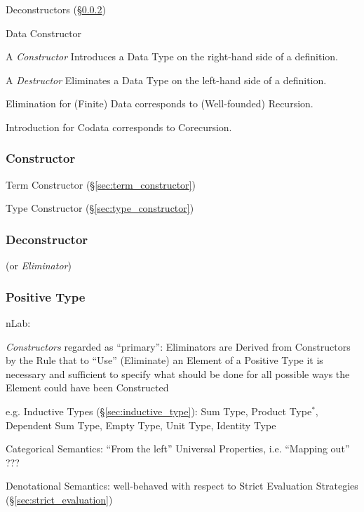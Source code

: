 Deconstructors (\S\ref{sec:deconstructor})


\asterism


Data Constructor

A \emph{Constructor} Introduces a Data Type on the right-hand side of
a definition.

A \emph{Destructor} Eliminates a Data Type on the left-hand side of a
definition.

Elimination for (Finite) Data corresponds to (Well-founded)
Recursion.

Introduction for Codata corresponds to Corecursion.




\subsubsection{Constructor}\label{sec:constructor}

Term Constructor (\S\ref{sec:term_constructor})

Type Constructor (\S\ref{sec:type_constructor})



\subsubsection{Deconstructor}\label{sec:deconstructor}

(or \emph{Eliminator})



\subsubsection{Positive Type}\label{sec:positive_type}

nLab:

\emph{Constructors} regarded as ``primary'': Eliminators are Derived
from Constructors by the Rule that to ``Use'' (Eliminate) an Element
of a Positive Type it is necessary and sufficient to specify what
should be done for all possible ways the Element could have been
Constructed

e.g. Inductive Types (\S\ref{sec:inductive_type}): Sum Type, Product
Type$^*$, Dependent Sum Type, Empty Type, Unit Type, Identity Type

Categorical Semantics: ``From the left'' Universal Properties, i.e.
``Mapping out'' ???

Denotational Semantics: well-behaved with respect to Strict Evaluation
Strategies (\S\ref{sec:strict_evaluation})



